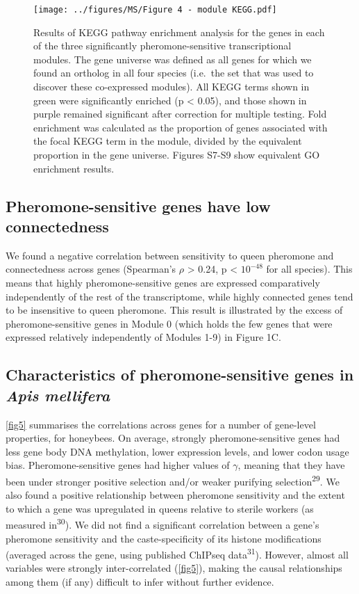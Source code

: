 \documentclass[12pt,]{article}
\begin{document}
\begin{figure}
\centering
\texttt{[image: ../figures/MS/Figure 4 - module KEGG.pdf]}
\caption{Results of KEGG pathway enrichment analysis for the genes in
each of the three significantly pheromone-sensitive transcriptional
modules. The gene universe was defined as all genes for which we found
an ortholog in all four species (i.e.~the set that was used to discover
these co-expressed modules). All KEGG terms shown in green were
significantly enriched (p \textless{} 0.05), and those shown in purple
remained significant after correction for multiple testing. Fold
enrichment was calculated as the proportion of genes associated with the
focal KEGG term in the module, divided by the equivalent proportion in
the gene universe. Figures S7-S9 show equivalent GO enrichment results.
\label{fig4}}
\end{figure}

\subsection{Pheromone-sensitive genes have low
connectedness}\label{pheromone-sensitive-genes-have-low-connectedness}

We found a negative correlation between sensitivity to queen pheromone
and connectedness across genes (Spearman's \(\rho\) \textgreater{} 0.24,
p \textless{} \(10^{-48}\) for all species). This means that highly
pheromone-sensitive genes are expressed comparatively independently of
the rest of the transcriptome, while highly connected genes tend to be
insensitive to queen pheromone. This result is illustrated by the excess
of pheromone-sensitive genes in Module 0 (which holds the few genes that
were expressed relatively independently of Modules 1-9) in Figure 1C.

\subsection{\texorpdfstring{Characteristics of pheromone-sensitive genes
in \emph{Apis
mellifera}}{Characteristics of pheromone-sensitive genes in Apis mellifera}}\label{characteristics-of-pheromone-sensitive-genes-in-apis-mellifera}

\autoref{fig5} summarises the correlations across genes for a number of
gene-level properties, for honeybees. On average, strongly
pheromone-sensitive genes had less gene body DNA methylation, lower
expression levels, and lower codon usage bias. Pheromone-sensitive genes
had higher values of \(\gamma\), meaning that they have been under
stronger positive selection and/or weaker purifying
selection\textsuperscript{29}. We also found a positive relationship
between pheromone sensitivity and the extent to which a gene was
upregulated in queens relative to sterile workers (as measured
in\textsuperscript{30}). We did not find a significant correlation
between a gene's pheromone sensitivity and the caste-specificity of its
histone modifications (averaged across the gene, using published ChIPseq
data\textsuperscript{31}). However, almost all variables were strongly
inter-correlated (\autoref{fig5}), making the causal relationships among
them (if any) difficult to infer without further evidence.
\end{document}
